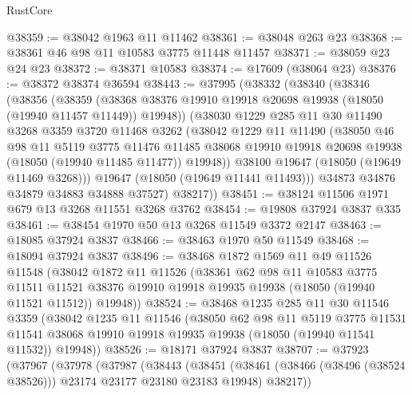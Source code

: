 \begin{lexlean}{RustCore}
\begin{coremodule}
@38359 := @38042 @1963 @11 @11462
@38361 := @38048 @263 @23
@38368 := @38361 @46 @98 @11 @10583 @3775 @11448 @11457
@38371 := @38059 @23 @24 @23
@38372 := @38371 @10583
@38374 := @17609 (@38064 @23)
@38376 := @38372 @38374 @36594
@38443 := @37995
    (@38332
      (@38340
        (@38346
          (@38356
            (@38359
              (@38368 @38376 @19910 @19918 @20698 @19938 (@18050 (@19940 @11457 @11449)) @19948))
            (@38030
              @1229
              @285
              @11
              @30
              @11490
              @3268
              @3359
              @3720
              @11468
              @3262
              (@38042
                @1229
                @11
                @11490
                (@38050
                  @46
                  @98
                  @11
                  @5119
                  @3775
                  @11476
                  @11485
                  @38068
                  @19910
                  @19918
                  @20698
                  @19938
                  (@18050 (@19940 @11485 @11477))
                  @19948))
              @38100
              @19647
              (@18050 (@19649 @11469 @3268)))
            @19647
            (@18050 (@19649 @11441 @11493)))
          @34873
          @34876
          @34879
          @34883
          @34888
          @37527)
        @38217))
@38451 := @38124 @11506 @1971 @679 @13 @3268 @11551 @3268 @3762
@38454 := @19808 @37924 @3837 @335
@38461 := @38454 @1970 @50 @13 @3268 @11549 @3372 @2147
@38463 := @18085 @37924 @3837
@38466 := @38463 @1970 @50 @11549
@38468 := @18094 @37924 @3837
@38496 := @38468
    @1872
    @1569
    @11
    @49
    @11526
    @11548
    (@38042
      @1872
      @11
      @11526
      (@38361
        @62
        @98
        @11
        @10583
        @3775
        @11511
        @11521
        @38376
        @19910
        @19918
        @19935
        @19938
        (@18050 (@19940 @11521 @11512))
        @19948))
@38524 := @38468
    @1235
    @285
    @11
    @30
    @11546
    @3359
    (@38042
      @1235
      @11
      @11546
      (@38050
        @62
        @98
        @11
        @5119
        @3775
        @11531
        @11541
        @38068
        @19910
        @19918
        @19935
        @19938
        (@18050 (@19940 @11541 @11532))
        @19948))
@38526 := @18171 @37924 @3837
@38707 := @37923
    (@37967
      (@37978
        (@37987
          (@38443
            (@38451
              (@38461 (@38466 (@38496 (@38524 @38526))) @23174 @23177 @23180 @23183 @19948)
              @38217))

\end{coremodule}
\end{lexlean}
